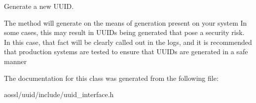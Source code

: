 Generate a new U\+U\+ID. 

The method will generate on the means of generation present on your system In some cases, this may result in U\+U\+ID\textquotesingle{}s being generated that pose a security risk. In this case, that fact will be clearly called out in the logs, and it is recommended that production systems are tested to ensure that U\+U\+ID\textquotesingle{}s are generated in a safe manner 

The documentation for this class was generated from the following file\+:\begin{DoxyCompactItemize}
\item 
aossl/uuid/include/uuid\+\_\+interface.\+h\end{DoxyCompactItemize}
